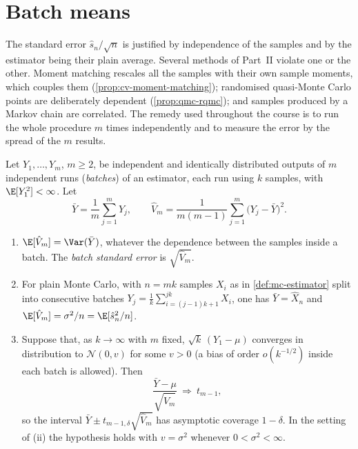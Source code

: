 
\section{Batch means}\label{sec:mc-batch}

The standard error $\hat s_n/\sqrt n$ is justified by independence of the samples and by the
estimator being their plain average. Several methods of Part~II violate one or the other.
Moment matching rescales all the samples with their own sample moments, which couples them
(\cref{prop:cv-moment-matching}); randomised quasi-Monte Carlo points are deliberately
dependent (\cref{prop:qmc-rqmc}); and samples produced by a Markov chain are correlated. The
remedy used throughout the course is to run the whole procedure $m$ times independently and
to measure the error by the spread of the $m$ results.

\begin{proposition}\label{prop:mc-batch}
Let $Y_1,\dots,Y_m$, $m\ge2$, be independent and identically distributed outputs of $m$
independent runs (\emph{batches}) of an estimator, each run using $k$ samples, with
$\E[Y_1^2]<\infty$. Let
\[
  \bar Y=\frac1m\sum_{j=1}^mY_j,\qquad
  \hat V_m=\frac{1}{m(m-1)}\sum_{j=1}^m\big(Y_j-\bar Y\big)^2 .
\]
\begin{enumerate}[label=(\roman*)]
  \item $\E[\hat V_m]=\Var(\bar Y)$, whatever the dependence between the samples inside a
    batch. The \emph{batch standard error} is $\sqrt{\hat V_m}$.
  \item For plain Monte Carlo, with $n=mk$ samples $X_i$ as in \cref{def:mc-estimator} split
    into consecutive batches $Y_j=\frac1k\sum_{i=(j-1)k+1}^{jk}X_i$, one has $\bar Y=\hat X_n$
    and $\E[\hat V_m]=\sigma^2/n=\E[\hat s_n^2/n]$.
  \item Suppose that, as $k\to\infty$ with $m$ fixed, $\sqrt k\,(Y_1-\mu)$ converges in
    distribution to $\mathcal N(0,v)$ for some $v>0$ (a bias of order $o(k^{-1/2})$ inside
    each batch is allowed). Then
    \[
      \frac{\bar Y-\mu}{\sqrt{\hat V_m}}\ \Rightarrow\ t_{m-1},
    \]
    so the interval $\bar Y\pm t_{m-1,\delta}\sqrt{\hat V_m}$ has asymptotic coverage
    $1-\delta$. In the setting of (ii) the hypothesis holds with $v=\sigma^2$ whenever
    $0<\sigma^2<\infty$.
\end{enumerate}
\end{proposition}

